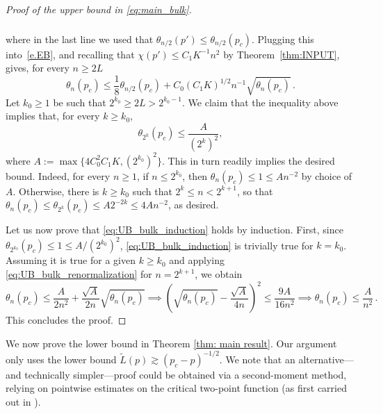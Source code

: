 \documentclass[11pt,a4paper]{article}
\numberwithin{equation}{section}
\theoremstyle{plain}
\theoremstyle{definition}
\newcommand{\1}{\mathbf 1}
\begin{document}
\begin{proof}[Proof of the upper bound in \eqref{eq:main_bulk}]
\begin{align}
\begin{split}
	\end{split}
	\end{align}
	where in the last line we used that $\theta_{n/2}(p')\leq \theta_{n/2}(p_c)$.
	Plugging this into~\eqref{e.EB}, and recalling that $\chi(p')\leq C_1K^{-1} n^{2}$ by Theorem~\ref{thm:INPUT}, gives, for every $n\geq 2L$
	\begin{equation}\label{eq:UB_bulk_renormalization}
		\theta_n(p_c)  \leq  \frac{1}{8}\theta_{n/2}(p_c) + C_0 (C_1K)^{1/2}  n^{-1}\sqrt{ \theta_n(p_c)   }\,.
	\end{equation}
	Let $k_0\geq 1$ be such that $2^{k_0}\geq 2L>2^{k_0-1}$.
	We claim that the inequality above implies that, for every $k\geq k_0$,
	\begin{equation}\label{eq:UB_bulk_induction}
		\theta_{2^{k}}(p_c)   \leq \frac {A} {(2^{k})^2},
	\end{equation}
	where $A:=\max\{4C_0^2C_1K,(2^{k_0})^2\}$. This in turn readily implies the desired bound. Indeed, for every $n\geq 1$, if $n\leq 2^{k_0}$, then $\theta_n(p_c)\leq 1\leq An^{-2}$ by choice of $A$. Otherwise, there is $k\geq k_0$ such that $2^k\leq n < 2^{k+1}$, so that $\theta_n(p_c)\leq \theta_{2^{k}}(p_c)   \leq A 2^{-2k} \leq 4An^{-2}$, as desired.
	
	Let us now prove that \eqref{eq:UB_bulk_induction} holds by induction. First, since $\theta_{2^{k_0}}(p_c)\leq1 \leq A/(2^{k_0})^2$, \eqref{eq:UB_bulk_induction} is trivially true for $k=k_0$. Assuming it is true for a given $k\geq k_0$ and applying \eqref{eq:UB_bulk_renormalization} for $n=2^{k+1}$, we obtain
		\begin{equation}
		\theta_n(p_c)  \leq  \frac{A}{2n^2} +  \frac {\sqrt{A}}{2n}  \sqrt{ \theta_n(p_c)   } \implies \left( \sqrt{\theta_n(p_c)}  -  \frac{\sqrt{A}}{4n} \right)^2\leq \frac{9A}{16n^2} \implies \theta_n(p_c)\leq \frac{A}{n^2}\,.
		\end{equation}
	This concludes the proof.
\end{proof}


 We now prove the lower bound in Theorem \ref{thm: main result}. Our argument only uses the lower bound $\tilde{L}(p)\gtrsim(p_c-p)^{-1/2}$. We note that an alternative---and technically simpler---proof could be obtained via a second-moment method, relying on pointwise estimates on the critical two-point function (as first carried out in \cite{sakai2004mean}).  
\end{document}
